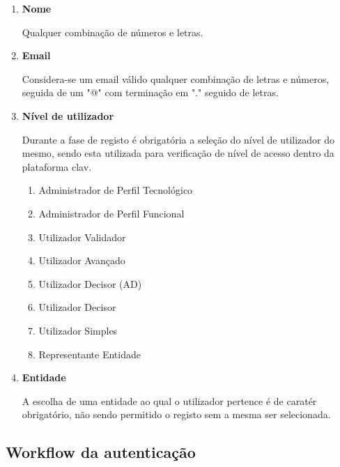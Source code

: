 \begin{enumerate}
    \item \textbf{Nome}
    
        Qualquer combinação de números e letras.
    \item \textbf{Email}
    
        Considera-se um email válido qualquer combinação de letras e números, seguida de um "@" com terminação em "." seguido de letras.
    \item \textbf{Nível de utilizador}
    
        Durante a fase de registo é obrigatória a seleção do nível de utilizador do mesmo, sendo esta utilizada para verificação de nível de acesso dentro da plataforma \gls{clav}.
    \begin{enumerate}
        \item Administrador de Perfil Tecnológico
        \item Administrador de Perfil Funcional
        \item Utilizador Validador
        \item Utilizador Avançado
        \item Utilizador Decisor (AD)
        \item Utilizador Decisor
        \item Utilizador Simples
        \item Representante Entidade
    \end{enumerate}
    \item \textbf{Entidade}
    
        A escolha de uma entidade ao qual o utilizador pertence é de caratér obrigatório, não sendo permitido o registo sem a mesma ser selecionada.
\end{enumerate}

\cleardoublepage
\subsection{Workflow da autenticação}

